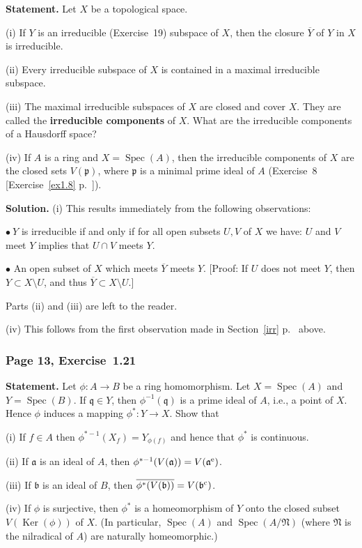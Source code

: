 \documentclass[12pt,letterpaper]{article}%
\newcommand{\mf}{\mathfrak}
\newcommand{\aaa}{\mf a}
\newcommand{\bbb}{\mf b}
\newcommand{\ppp}{\mf p}
\newcommand{\qqq}{\mf q}
\newcommand{\NNN}{\mf N}\newcommand{\RRR}{\mf R}
\newcommand{\ov}{\overline}
\newcommand{\bu}{\bullet}
\newcommand{\Ker}{\operatorname{Ker}}\newcommand{\Coker}{\operatorname{Coker}}
\newcommand{\Spec}{\operatorname{Spec}}\newcommand{\Sp}{\operatorname{Spec}}
\newcommand{\nn}{\noindent}
\begin{document}
\textbf{Statement.} Let $X$ be a topological space.

\nn(i) If $Y$ is an irreducible (Exercise~19) subspace of $X$, then the closure $\overline Y$ of $Y$ in $X$ is irreducible.

\nn(ii) Every irreducible subspace of $X$ is contained in a maximal irreducible subspace.

\nn(iii) The maximal irreducible subspaces of $X$ are closed and cover $X$. They are called the \textbf{irreducible components} of $X$. What are the irreducible components of a Hausdorff space?

\nn(iv) If $A$ is a ring and $X=\Spec(A)$, then the irreducible components of $X$ are the closed sets $V(\ppp)$, where $\ppp$ is a minimal prime ideal of $A$ (Exercise~8 [Exercise~\ref{ex1.8} p.~\pageref{ex1.8}]).

\nn\textbf{Solution.} (i) This results immediately from the following observations:

\nn$\bu\ Y$ is irreducible if and only if for all open subsets $U,V$ of $X$ we have: $U$ and $V$ meet $Y$ implies that $U\cap V$ meets $Y$.

\nn$\bu$ An open subset of $X$ which meets $\overline Y$ meets $Y$. [Proof: If $U$ does not meet $Y$, then $Y\subset X\setminus U$, and thus $\overline Y\subset X\setminus U$.] 

Parts (ii) and (iii) are left to the reader.

\nn(iv) This follows from the first observation made in Section~\ref{irr} p.~\pageref{irr} above.

\subsubsection{Page 13, Exercise~1.21}\label{ex1.21}%

\textbf{Statement.} Let $\phi:A\to B$ be a ring homomorphism. Let $X=\Spec(A)$ and $Y=\Spec(B)$. If $\qqq\in Y$, then $\phi^{-1}(\qqq)$ is a prime ideal of $A$, i.e., a point of $X$. Hence $\phi$ induces a mapping $\phi^*:Y\to X$. Show that

\nn(i) If $f\in A$ then $\phi^{*-1}(X_f)=Y_{\phi(f)}$ and hence that $\phi^*$ is continuous.

\nn(ii) If $\aaa$ is an ideal of $A$, then $\phi^{*-1}(V(\aaa))=V(\aaa^{\text e})$.

\nn(iii) If $\bbb$ is an ideal of $B$, then $\ov{\phi^*(V(\bbb))}=V(\bbb^{\text c})$.

\nn(iv) If $\phi$ is surjective, then $\phi^*$ is a homeomorphism of $Y$ onto the closed subset $V(\Ker(\phi))$ of $X$. (In particular, $\Spec(A)$ and $\Spec(A/\NNN)$ (where $\NNN$ is the nilradical of $A$) are naturally homeomorphic.)
\end{document}
